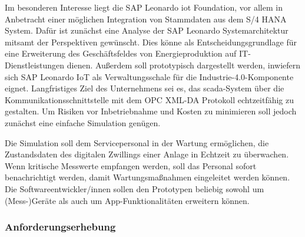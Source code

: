 \noindent Im besonderen Interesse liegt die SAP Leonardo \ac{iot} Foundation, vor allem in Anbetracht einer möglichen Integration von Stammdaten aus dem S/4 HANA System. Dafür ist zunächst eine Analyse der SAP Leonardo Systemarchitektur mitsamt der Perspektiven gewünscht. Dies könne als Entscheidungsgrundlage für eine Erweiterung des Geschäftsfeldes von Energieproduktion auf IT-Dienstleistungen dienen. Außerdem soll prototypisch dargestellt werden, inwiefern sich SAP Leonardo IoT als Verwaltungsschale für die Industrie-4.0-Komponente eignet. Langfristiges Ziel des Unternehmens sei es, das \ac{scada}-System über die Kommunikationsschnittstelle mit dem OPC XML-DA Protokoll echtzeitfähig zu gestalten. Um Risiken vor Inbetriebnahme und Kosten zu minimieren soll jedoch zunächst eine einfache Simulation genügen.

\noindent Die Simulation soll dem Servicepersonal in der Wartung ermöglichen, die Zustandsdaten des digitalen Zwillings einer Anlage in Echtzeit zu überwachen. Wenn kritische Messwerte empfangen werden, soll das Personal sofort benachrichtigt werden, damit Wartungsmaßnahmen eingeleitet werden können. Die Softwareentwickler/innen sollen den Prototypen beliebig sowohl um (Mess-)Geräte als auch um App-Funktionalitäten erweitern können.

\subsubsection{Anforderungserhebung}

